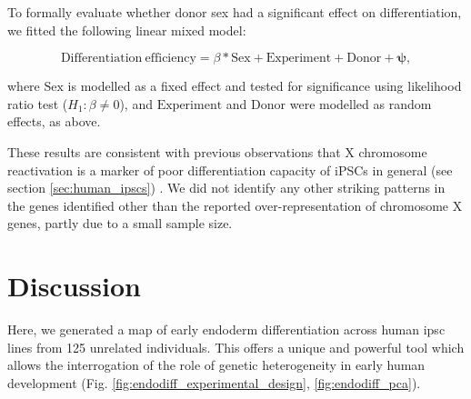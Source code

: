 \newpage

To formally evaluate whether donor sex had a significant effect on differentiation, we fitted the following linear mixed model:

\begin{equation}
    \mathrm{Differentiation} \ \mathrm{efficiency} = \beta*\mathrm{Sex} + \mathrm{Experiment} + \mathrm{Donor} + \boldsymbol{\psi},
\end{equation}

where $\mathrm{Sex}$ is modelled as a fixed effect and tested for significance using likelihood ratio test ($H_1: \beta \neq 0$), and $\mathrm{Experiment}$ and $\mathrm{Donor}$ were modelled as random effects, as above.

These results are consistent with previous observations that X chromosome reactivation is a marker of poor differentiation capacity of iPSCs in general (see section \ref{sec:human_ipscs}) \cite{anguera2012molecular, patel2017human}. 
We did not identify any other striking patterns in the genes identified other than the reported over-representation of chromosome X genes, partly due to a small sample size.



\section{Discussion}



Here, we generated a map of early endoderm differentiation across human \gls{ipsc} lines from 125 unrelated individuals.
This offers a unique and powerful tool which allows the interrogation of the role of genetic heterogeneity in early human development (Fig. \ref{fig:endodiff_experimental_design}, \ref{fig:endodiff_pca}). \\

